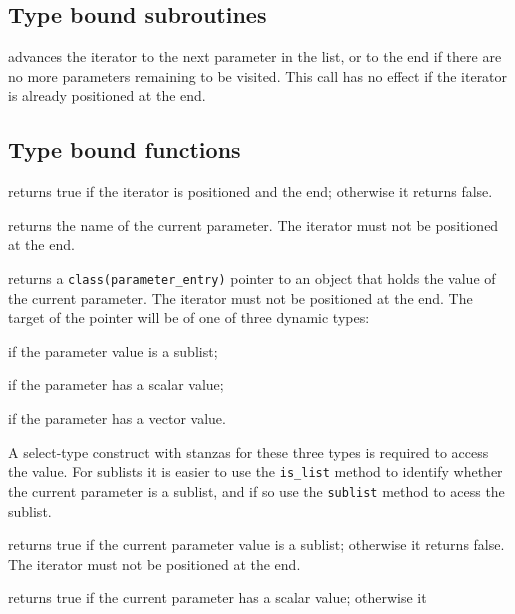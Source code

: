 \documentclass[11pt]{article}
\begin{document}
\subsection{Type bound subroutines}
\begin{description}[style=nextline]\setlength{\itemsep}{0pt}
\item[\texttt{next()}]
  advances the iterator to the next parameter in the list, or to the end if
  there are no more parameters remaining to be visited.  This call has no
  effect if the iterator is already positioned at the end. 
\end{description}

\subsection{Type bound functions}
\begin{description}[style=nextline]\setlength{\itemsep}{0pt}
\item[\texttt{at_end()}]
  returns true if the iterator is positioned and the end; otherwise it
  returns false.
\item[\texttt{name()}]
  returns the name of the current parameter.  The iterator must not be
  positioned at the end.
\item[\texttt{value()}]
  returns a \texttt{class(parameter_entry)} pointer to an object that holds
  the value of the current parameter.  The iterator must not be positioned
  at the end. The target of the pointer will be of one of three dynamic types:
  \begin{description}\setlength{\itemsep}{0pt}
  \item[\texttt{parameter_list}] if the parameter value is a sublist;
  \item[\texttt{any_scalar}] if the parameter has a scalar value;
  \item[\texttt{any_vector}] if the parameter has a vector value.
  \end{description}
  A select-type construct with stanzas for these three types is required
  to access the value.  For sublists it is easier to use the \texttt{is_list}
  method to identify whether the current parameter is a sublist, and if so
  use the \texttt{sublist} method to acess the sublist.
\item[\texttt{is_list()}]
  returns true if the current parameter value is a sublist; otherwise it
  returns false.  The iterator must not be positioned at the end.
\item[\texttt{is_scalar()}]
  returns true if the current parameter has a scalar value; otherwise it

\end{description}
\end{document}
